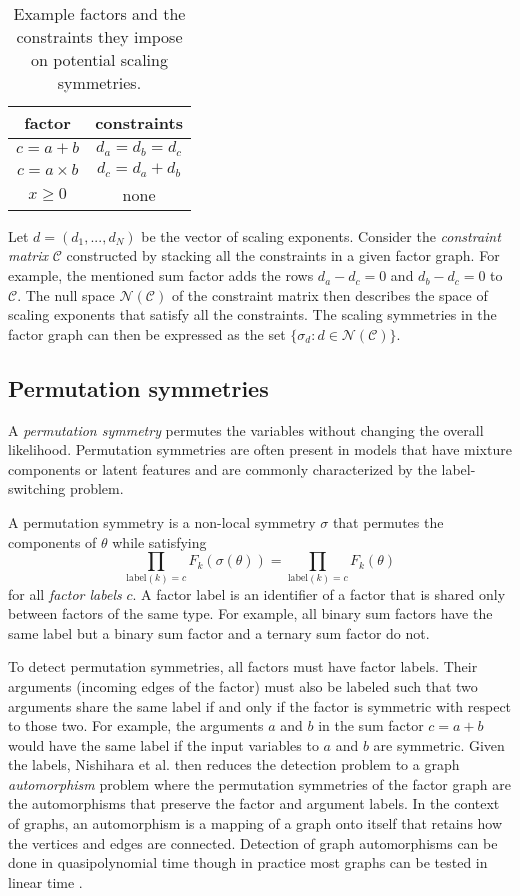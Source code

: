 \begin{table}[b]
\centering
\begin{tabular}{|c|c|}
\hline
factor & constraints \\
\hline
$c=a+b$ & $d_a = d_b = d_c$ \\
$c = a\times b$ & $d_c= d_a + d_b$ \\
$x\geq0$ & none \\
\hline
\end{tabular}
\caption{Example factors and the constraints they impose on potential scaling symmetries.}
\label{tab:scaling}
\end{table}

Let $d=(d_1,...,d_N)$ be the vector of scaling exponents. Consider the \textit{constraint matrix} $\mathcal{C}$ constructed by stacking all the constraints in a given factor graph. For example, the mentioned sum factor adds the rows $d_a-d_c=0$ and $d_b-d_c=0$ to $\mathcal{C}$. The null space $\mathcal{N}(\mathcal{C})$ of the constraint matrix then describes the space of scaling exponents that satisfy all the constraints. The scaling symmetries in the factor graph can then be expressed as the set $\{\sigma_d:d\in\mathcal{N}(\mathcal{C})\}$.


\subsection{Permutation symmetries} \label{sec:permutation}

A \textit{permutation symmetry} permutes the variables without changing the overall likelihood. Permutation symmetries are often present in models that have mixture components or latent features and are commonly characterized by the label-switching problem.

\begin{defn}
A permutation symmetry is a non-local symmetry $\sigma$ that permutes the components of $\theta$ while satisfying
\[
\prod_{\text{label}(k)=c}F_k(\sigma(\theta)) = \prod_{\text{label}(k)=c}F_k(\theta)
\]
for all \textit{factor labels} $c$. A factor label is an identifier of a factor that is shared only between factors of the same type. For example, all binary sum factors have the same label but a binary sum factor and a ternary sum factor do not.
\end{defn}

To detect permutation symmetries, all factors must have factor labels. Their arguments (incoming edges of the factor) must also be labeled such that two arguments share the same label if and only if the factor is symmetric with respect to those two. For example, the arguments $a$ and $b$ in the sum factor $c=a+b$ would have the same label if the input variables to $a$ and $b$ are symmetric. Given the labels, Nishihara et al. then reduces the detection problem to a graph \textit{automorphism} problem where the permutation symmetries of the factor graph are the automorphisms that preserve the factor and argument labels. In the context of graphs, an automorphism is a mapping of a graph onto itself that retains how the vertices and edges are connected. Detection of graph automorphisms can be done in quasipolynomial time \cite{Babai:2016} though in practice most graphs can be tested in linear time \cite{Babai:1980}.

